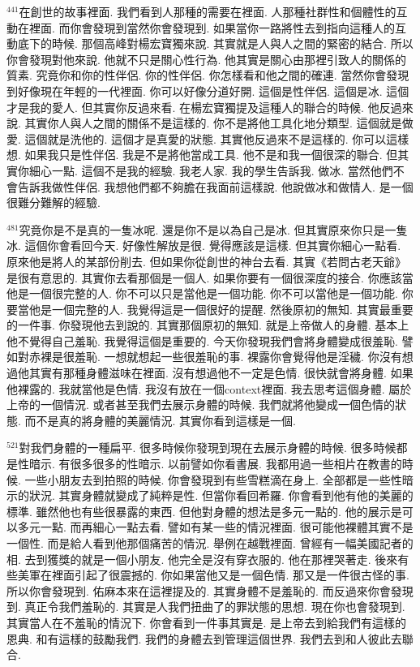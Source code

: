 \documentclass{book}
\begin{document}
$^{441}$在創世的故事裡面.
我們看到人那種的需要在裡面.
人那種社群性和個體性的互動在裡面.
而你會發現到當然你會發現到.
如果當你一路將性去到指向這種人的互動底下的時候.
那個高峰對楊宏寶獨來說.
其實就是人與人之間的緊密的結合.
所以你會發現對他來說.
他就不只是關心性行為.
他其實是關心由那裡引致人的關係的質素.
究竟你和你的性伴侶.
你的性伴侶.
你怎樣看和他之間的確連.
當然你會發現到好像現在年輕的一代裡面.
你可以好像分道好開.
這個是性伴侶.
這個是冰.
這個才是我的愛人.
但其實你反過來看.
在楊宏寶獨提及這種人的聯合的時候.
他反過來說.
其實你人與人之間的關係不是這樣的.
你不是將他工具化地分類型.
這個就是做愛.
這個就是洗他的.
這個才是真愛的狀態.
其實他反過來不是這樣的.
你可以這樣想.
如果我只是性伴侶.
我是不是將他當成工具.
他不是和我一個很深的聯合.
但其實你細心一點.
這個不是我的經驗.
我老人家.
我的學生告訴我.
做冰.
當然他們不會告訴我做性伴侶.
我想他們都不夠膽在我面前這樣說.
他說做冰和做情人.
是一個很難分難解的經驗.

$^{481}$究竟你是不是真的一隻冰呢.
還是你不是以為自己是冰.
但其實原來你只是一隻冰.
這個你會看回今天.
好像性解放是很.
覺得應該是這樣.
但其實你細心一點看.
原來他是將人的某部份削去.
但如果你從創世的神台去看.
其實《若問古老天爺》是很有意思的.
其實你去看那個是一個人.
如果你要有一個很深度的接合.
你應該當他是一個很完整的人.
你不可以只是當他是一個功能.
你不可以當他是一個功能.
你要當他是一個完整的人.
我覺得這是一個很好的提醒.
然後原初的無知.
其實最重要的一件事.
你發現他去到說的.
其實那個原初的無知.
就是上帝做人的身體.
基本上他不覺得自己羞恥.
我覺得這個是重要的.
今天你發現我們會將身體變成很羞恥.
譬如對赤裸是很羞恥.
一想就想起一些很羞恥的事.
裸露你會覺得他是淫穢.
你沒有想過他其實有那種身體滋味在裡面.
沒有想過他不一定是色情.
很快就會將身體.
如果他裸露的.
我就當他是色情.
我沒有放在一個context裡面.
我去思考這個身體.
屬於上帝的一個情況.
或者甚至我們去展示身體的時候.
我們就將他變成一個色情的狀態.
而不是真的將身體的美麗情況.
其實你看到這樣是一個.

$^{521}$對我們身體的一種扁平.
很多時候你發現到現在去展示身體的時候.
很多時候都是性暗示.
有很多很多的性暗示.
以前譬如你看書展.
我都用過一些相片在教書的時候.
一些小朋友去到拍照的時候.
你會發現到有些雪糕滴在身上.
全部都是一些性暗示的狀況.
其實身體就變成了純粹是性.
但當你看回希羅.
你會看到他有他的美麗的標準.
雖然他也有些很暴露的東西.
但他對身體的想法是多元一點的.
他的展示是可以多元一點.
而再細心一點去看.
譬如有某一些的情況裡面.
很可能他裸體其實不是一個性.
而是給人看到他那個痛苦的情況.
舉例在越戰裡面.
曾經有一幅美國記者的相.
去到獲獎的就是一個小朋友.
他完全是沒有穿衣服的.
他在那裡哭著走.
後來有些美軍在裡面引起了很震撼的.
你如果當他又是一個色情.
那又是一件很古怪的事.
所以你會發現到.
佑麻本來在這裡提及的.
其實身體不是羞恥的.
而反過來你會發現到.
真正令我們羞恥的.
其實是人我們扭曲了的罪狀態的思想.
現在你也會發現到.
其實當人在不羞恥的情況下.
你會看到一件事其實是.
是上帝去到給我們有這樣的恩典.
和有這樣的鼓勵我們.
我們的身體去到管理這個世界.
我們去到和人彼此去聯合.
\end{document}
